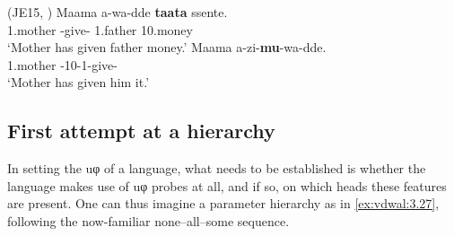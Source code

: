 \documentclass[output=paper]{langsci/langscibook}
\begin{document}
\ea\label{ex:vdwal:3.25}  (JE15, \citealt[67, 72]{Ssekiryango2006})\label{bkm:Ref286389666}
    \ea
    \gll Maama  a-wa-dde  \textbf{taata}  ssente.\\
        1.mother  \First\Sm{}-give-\Pfv{}  1.father  10.money\\
    \glt    ‘Mother has given father money.’
    \ex
    \gll Maama  a-zi-\textbf{mu}-wa-dde. \\
        1.mother  \First\Sm{}{}-10\Om{}-1\Om{}-give-\Pfv{} \\
    \glt    ‘Mother has given him it.’
    \z
\ex\label{ex:vdwal:3.26}\label{bkm:Ref347511825}
\z

\subsection{First attempt at a hierarchy}\label{sub:3.3.2}

In setting the uφ  of a language, what needs to be established is
wheth\-er the language makes use of uφ probes at all, and if so, on which heads
these features are present. One can thus imagine a parameter hierarchy as in
\eqref{ex:vdwal:3.27}, following the now-familiar none--all--some
sequence.
\end{document}
